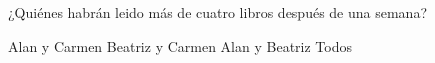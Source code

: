 ¿Quiénes habr\'an leido m\'as de cuatro libros despu\'es de una semana?

\begin{choices}
    \choice Alan y Carmen
    \choice Beatriz y Carmen
    \CorrectChoice Alan y Beatriz
    \choice Todos
\end{choices}